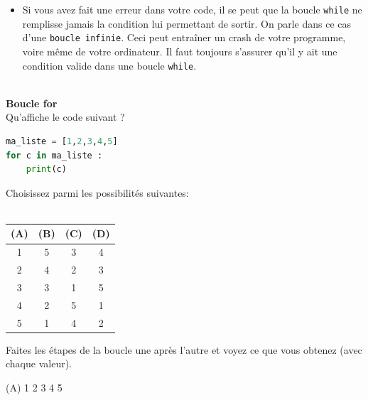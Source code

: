 \begin{itemize}
     	\item Si vous avez fait une erreur dans votre code, il se peut que la boucle \lstinline{while} ne remplisse jamais la condition lui permettant de sortir. On parle dans ce cas d'une \lstinline{boucle infinie}. Ceci peut entraîner un crash de votre programme, voire même de votre ordinateur. Il faut toujours s'assurer qu'il y ait une condition valide dans une boucle \lstinline{while}. \\\\
     	
     	\end{itemize}
     	
     	
    \begin{Exercice}[5 minutes] [Python] \textbf{Boucle for}\\
      	Qu'affiche le code suivant ?
      	
      	\begin{lstlisting}[language=Python]
ma_liste = [1,2,3,4,5]
for c in ma_liste :
    print(c) 
             	\end{lstlisting}
             	
        Choisissez parmi les possibilités suivantes: \\ \\
        \begin{tabular}{|c|c|c|c|}
\hline
(A) & (B) & (C) & (D)  \\
\hline
1 & 5 & 3 & 4 \\
2 & 4 & 2 & 3 \\
3 & 3 & 1 & 5 \\
4 & 2 & 5 & 1 \\
5 & 1 & 4 & 2 \\
\hline
\end{tabular}
    
        \begin{conseil}
		   Faites les étapes de la boucle une après l'autre et voyez ce que vous obtenez (avec chaque valeur).  
        \end{conseil}
        
        \begin{solution}
           (A) 1 
               2 
               3 
               4 
               5
        \end{solution}
    \end{Exercice}
    

